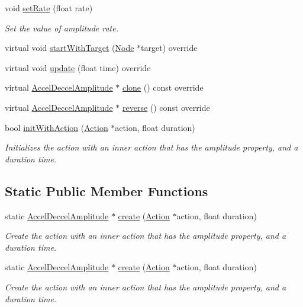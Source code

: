 \begin{DoxyCompactItemize}
void \hyperlink{classAccelDeccelAmplitude_a296256081f994850630d8ea889edba4a}{set\+Rate} (float rate)
\begin{DoxyCompactList}\small\item\em Set the value of amplitude rate. \end{DoxyCompactList}\item 
virtual void \hyperlink{classAccelDeccelAmplitude_ac81fd0ae7ecaae2076e9e4d912392204}{start\+With\+Target} (\hyperlink{classNode}{Node} $\ast$target) override
\item 
virtual void \hyperlink{classAccelDeccelAmplitude_a50371c814a78e3e01add896e1ec4b56b}{update} (float time) override
\item 
virtual \hyperlink{classAccelDeccelAmplitude}{Accel\+Deccel\+Amplitude} $\ast$ \hyperlink{classAccelDeccelAmplitude_a27eb88b47e9d6176029f62c7ec24a373}{clone} () const override
\item 
virtual \hyperlink{classAccelDeccelAmplitude}{Accel\+Deccel\+Amplitude} $\ast$ \hyperlink{classAccelDeccelAmplitude_ab0703eb5fa9cb39014d3a4430b19b05b}{reverse} () const override
\item 
bool \hyperlink{classAccelDeccelAmplitude_add6f2f8561d00c2ef3f7802b951ec0ce}{init\+With\+Action} (\hyperlink{classAction}{Action} $\ast$action, float duration)
\begin{DoxyCompactList}\small\item\em Initializes the action with an inner action that has the amplitude property, and a duration time. \end{DoxyCompactList}\end{DoxyCompactItemize}
\subsection*{Static Public Member Functions}
\begin{DoxyCompactItemize}
\item 
static \hyperlink{classAccelDeccelAmplitude}{Accel\+Deccel\+Amplitude} $\ast$ \hyperlink{classAccelDeccelAmplitude_a1edfd6faddca0ae76a2f336a9eeaff14}{create} (\hyperlink{classAction}{Action} $\ast$action, float duration)
\begin{DoxyCompactList}\small\item\em Create the action with an inner action that has the amplitude property, and a duration time. \end{DoxyCompactList}\item 
static \hyperlink{classAccelDeccelAmplitude}{Accel\+Deccel\+Amplitude} $\ast$ \hyperlink{classAccelDeccelAmplitude_aa9d4b4da47ccad833b5413078679a6e4}{create} (\hyperlink{classAction}{Action} $\ast$action, float duration)
\begin{DoxyCompactList}\small\item\em Create the action with an inner action that has the amplitude property, and a duration time. \end{DoxyCompactList}\end{DoxyCompactItemize}
